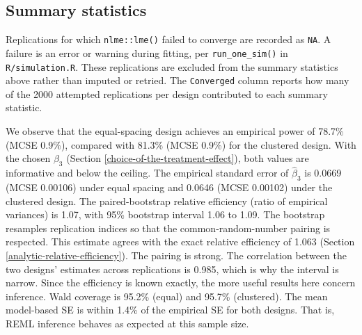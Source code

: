 \documentclass[
  11pt,
]{article}
\begin{document}
\subsection{Summary statistics}\label{summary-statistics}

\begin{table}[!h]
\centering
\caption{\label{tab:summary-table}Simulation results for the treatment-by-time interaction, with Monte Carlo standard errors (MCSE) of each metric computed following Morris, White, and Crowther (2019).}
\centering
{}
\end{table}

Replications for which \texttt{nlme::lme()} failed to converge are
recorded as \texttt{NA}. A failure is an error or warning during
fitting, per \texttt{run\_one\_sim()} in \texttt{R/simulation.R}. These
replications are excluded from the summary statistics above
rather than imputed or retried. The \texttt{Converged} column reports
how many of the 2000 attempted replications per design
contributed to each summary statistic.

We observe that the equal-spacing design achieves an empirical
power of 78.7\% (MCSE 0.9\%), compared with 81.3\% (MCSE
0.9\%) for the
clustered design. With the chosen \(\beta_3\)
(Section \ref{choice-of-the-treatment-effect}), both values are
informative and below the ceiling. The empirical
standard error of \(\hat{\beta}_3\) is 0.0669 (MCSE
0.00106) under equal spacing and
0.0646 (MCSE 0.00102) under
the clustered design. The paired-bootstrap relative efficiency
(ratio of empirical variances) is 1.07, with 95\% bootstrap interval 1.06 to 1.09. The
bootstrap resamples replication indices so that the
common-random-number pairing is respected. This estimate agrees
with the exact relative efficiency of 1.063
(Section \ref{analytic-relative-efficiency}). The pairing is
strong. The correlation between the two designs' estimates across
replications is 0.985, which is why the
interval is narrow. Since the efficiency is known exactly, the
more useful results here concern inference. Wald coverage is
95.2\% (equal) and
95.7\% (clustered). The mean
model-based SE is within
1.4\% of the empirical SE for
both designs. That is, REML inference behaves as expected at this
sample size.
\end{document}
